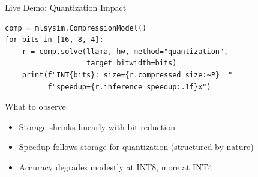 \documentclass[aspectratio=169, 12pt]{beamer}
\begin{document}
\begin{frame}[fragile]{Live Demo: Quantization Impact}

\small
\begin{lstlisting}
comp = mlsysim.CompressionModel()
for bits in [16, 8, 4]:
    r = comp.solve(llama, hw, method="quantization",
                   target_bitwidth=bits)
    print(f"INT{bits}: size={r.compressed_size:~P}  "
          f"speedup={r.inference_speedup:.1f}x")
\end{lstlisting}

\vspace{0.2cm}
\begin{exampleblock}{What to observe}
  \begin{itemize}
    \item Storage shrinks linearly with bit reduction
    \item Speedup follows storage for quantization (structured by nature)
    \item Accuracy degrades modestly at INT8, more at INT4
  \end{itemize}
\end{exampleblock}
\end{frame}
\end{document}
